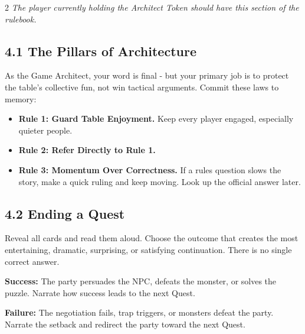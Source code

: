 \begin{multicols}{2}
\textit{The player currently holding the Architect Token should have this section of the rulebook.}

\subsection*{4.1 The Pillars of Architecture}
As the Game Architect, your word is final - but your primary job is to protect the table's collective fun, not win tactical arguments. Commit these laws to memory:
\begin{itemize}
  \item \textbf{Rule 1: Guard Table Enjoyment.} Keep every player engaged, especially quieter people.
  \item \textbf{Rule 2: Refer Directly to Rule 1.}
  \item \textbf{Rule 3: Momentum Over Correctness.} If a rules question slows the story, make a quick ruling and keep moving. Look up the official answer later.
\end{itemize}



\subsection*{4.2 Ending a Quest}
Reveal all cards and read them aloud. Choose the outcome that creates the most entertaining, dramatic, surprising, or satisfying continuation. There is no single correct answer.

\textbf{Success:} The party persuades the NPC, defeats the monster, or solves the puzzle. Narrate how success leads to the next Quest.

\textbf{Failure:} The negotiation fails, trap triggers, or monsters defeat the party. Narrate the setback and redirect the party toward the next Quest.


\end{multicols}
